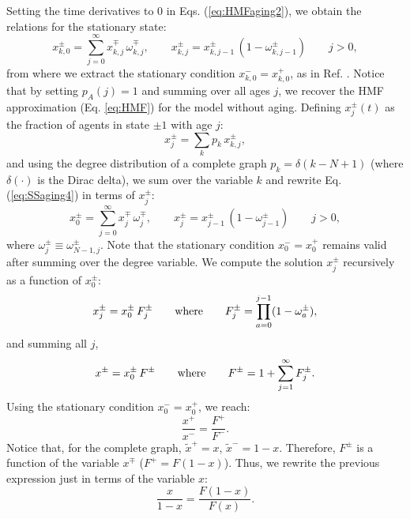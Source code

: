 
Setting the time derivatives to 0 in Eqs. (\ref{eq:HMFaging2}), we obtain the relations for the stationary state:
\begin{equation}
    x^{\pm}_{k,0} = \sum_{j=0}^{\infty} x^{\mp}_{k,j} \,  \omega_{k,j}^{\mp}, \quad \quad x^{\pm}_{k,j} = x^{\pm}_{k,j-1} \, ( 1 - \omega_{k,j-1}^{\pm})  \qquad j > 0, \label{eq:SSaging4}
\end{equation}
from where we extract the stationary condition $x^{-}_{k,0} = x^{+}_{k,0}$, as in Ref. \cite{chen-2020}. Notice that by setting $p_A(j) = 1$ and summing over all ages $j$, we recover the HMF approximation (Eq. \ref{eq:HMF}) for the model without aging. Defining $x^{\pm}_{j}(t)$ as the fraction of agents in state $\pm 1$ with age $j$:
\begin{equation}
    x^{\pm}_{j} = \sum_k p_k \, x^{\pm}_{k,j},
\end{equation}
and using the degree distribution of a complete graph $p_k = \delta(k-N+1)$ (where $\delta(\cdot)$ is the Dirac delta), we sum over the variable $k$ and rewrite Eq. (\ref{eq:SSaging4}) in terms of $x^{\pm}_{j}$:
\begin{equation}
    x^{\pm}_{0} = \sum_{j=0}^{\infty} x^{\mp}_{j} \, \omega_{j}^{\mp},  \quad \quad x^{\pm}_{j} = x^{\pm}_{j-1} \, ( 1 - \omega_{j-1}^{\pm})  \qquad j > 0,   \label{eq:SSSaging2}
\end{equation}
where $\omega_{j}^{\pm} \equiv \omega_{N-1,j}^{\pm}$. Note that the stationary condition $x^{-}_{0} = x^{+}_{0}$ remains valid after summing over the degree variable. We compute the solution $x^{\pm}_{j}$ recursively as a function of $x^{\pm}_0$:
\begin{equation}
    x^{\pm}_{j} = x^{\pm}_0 \, F_j^{\pm} \qquad {\rm where} \qquad F_j^{\pm} = \prod_{a = 0}^{j-1} (1 - \omega_a^{\pm}),
\end{equation}
and summing all $j$,
\begin{equation}
    x^{\pm} = x^{\pm}_0 \, F^{\pm}  \qquad {\rm where} \qquad F^{\pm} = 1 + \sum_{j=1}^{\infty} F_j^{\pm}.
\end{equation}
Using the stationary condition $x^{-}_0 = x^{+}_0$, we reach:
\begin{equation}
    \frac{x^{+}}{x^{-}} = \frac{F^{+}}{F^{-}}.
\end{equation}
Notice that, for the complete graph, $\tilde{x}^{+} = x$, $\tilde{x}^{-} = 1 - x$. Therefore, $F^{\pm}$ is a function of the variable $x^{\mp}$ ($F^{+} = F(1 - x)$). Thus, we rewrite the previous expression just in terms of the variable $x$:
\begin{equation}
    \frac{x}{1- x} = \frac{F(1 - x)}{F(x)}.
\end{equation}